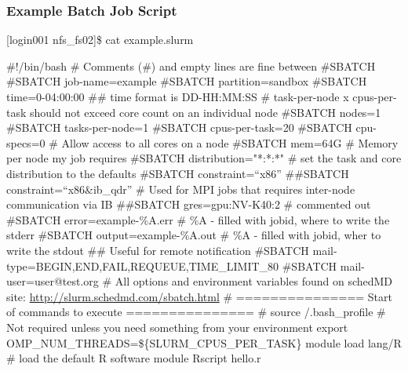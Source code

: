 \begin{frame}[fragile]
\frametitle{Example Batch Job Script}
\begin{semiverbatim}\tiny
[login001 nfs_fs02]\$ cat example.slurm

\#!/bin/bash
\# Comments (\#) and empty lines are fine between \#SBATCH
\#SBATCH \ddash{}job-name=example
\#SBATCH \ddash{}partition=sandbox
\#SBATCH \ddash{}time=0-04:00:00 ## time format is DD-HH:MM:SS
\# task-per-node x cpus-per-task should not exceed core count on an individual node 
\#SBATCH \ddash{}nodes=1
\#SBATCH \ddash{}tasks-per-node=1
\#SBATCH \ddash{}cpus-per-task=20
\#SBATCH \ddash{}cpu-specs=0 # Allow access to all cores on a node
\#SBATCH \ddash{}mem=64G \# Memory per node my job requires
\#SBATCH \ddash{}distribution="*:*:*" \# set the task and core distribution to the defaults
\#SBATCH \ddash{}constraint=``x86''
\#\#SBATCH \ddash{}constraint=``x86\&ib_qdr'' \# Used for MPI jobs that requires inter-node communication via IB
\#\#SBATCH \ddash{}gres=gpu:NV-K40:2 \# commented out
\#SBATCH \ddash{}error=example-\%A.err \# \%A - filled with jobid, where to write the stderr
\#SBATCH \ddash{}output=example-\%A.out \# \%A - filled with jobid, wher to write the stdout
\#\# Useful for remote notification
\#SBATCH \ddash{}mail-type=BEGIN,END,FAIL,REQUEUE,TIME\_LIMIT\_80
\#SBATCH \ddash{}mail-user=user@test.org
\# All options and environment variables found on schedMD site: \href{http://slurm.schedmd.com/sbatch.html}{http://slurm.schedmd.com/sbatch.html}
\# =============== Start of commands to execute ===============
\# source \ctilde/.bash_profile \# Not required unless you need something from your environment
export OMP\_NUM\_THREADS=\$\{SLURM\_CPUS\_PER\_TASK\}
module load lang/R  \# load the default R software module
Rscript hello.r
\end{semiverbatim}
\end{frame}
